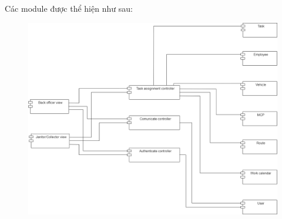 \documentclass[a4paper]{article}
\begin{document}
\begin{itemize}
\begin{itemize}
    \end{itemize}
        Các module được thể hiện như sau:\\
   \begin{figure}[!h]
    \begin{center}
      \includegraphics[width=6in]{Image/module.png}
    \end{center}
\end{figure}
     \end{itemize}
     \newpage
\end{document}
